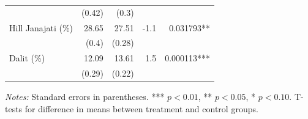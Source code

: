 \begin{table}[!h]
{\begin{threeparttable}
\begin{tabular}{lrrrr}
 & (0.42) & (0.3) & & \\
Hill Janajati (\%) & 28.65 & 27.51 & -1.1 & 0.031793** \\
 & (0.4) & (0.28) & & \\
Dalit (\%) & 12.09 & 13.61 & 1.5 & 0.000113*** \\
 & (0.29) & (0.22) & & \\
\bottomrule
\end{tabular}
\begin{tablenotes}
\footnotesize
\item \textit{Notes:} Standard errors in parentheses. *** $p<0.01$, ** $p<0.05$, * $p<0.10$. T-tests for difference in means between treatment and control groups.
\end{tablenotes}
\end{threeparttable}
}
\end{table}


